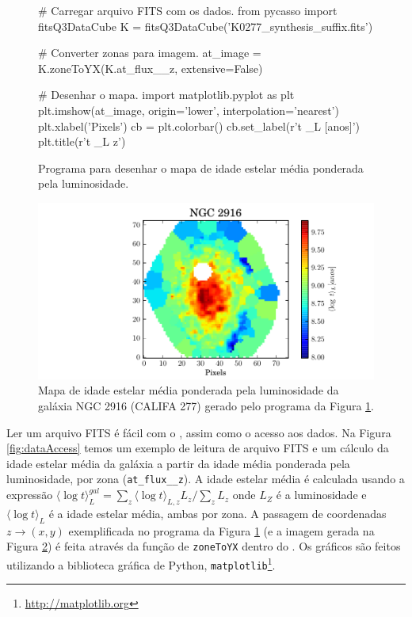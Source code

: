 \begin{figure}
	\begin{python}
# Carregar arquivo FITS com os dados.
from pycasso import fitsQ3DataCube
K = fitsQ3DataCube('K0277_synthesis_suffix.fits')

# Converter zonas para imagem.
at_image = K.zoneToYX(K.at_flux__z, extensive=False)

# Desenhar o mapa.
import matplotlib.pyplot as plt
plt.imshow(at_image, origin='lower', interpolation='nearest')
plt.xlabel('Pixels')
cb = plt.colorbar()
cb.set_label(r'\langle \log t \langle_L [anos]')
plt.title(r'\langle \log t \langle_{L z}')
	\end{python}
	\caption[Programa idade estelar média.]
	{Programa para desenhar o mapa de idade	estelar média ponderada pela luminosidade.}
	\label{fig:programaMapaIdade}
\end{figure}

\begin{figure}
	\includegraphics{figuras/at_flux_zone.pdf}
	\caption[Mapa da idade estelar média da galáxia NGC 2916 (CALIFA 277).] 
	{Mapa de idade estelar média ponderada pela luminosidade da galáxia NGC 2916 (CALIFA 277) gerado pelo programa da
	Figura \ref{fig:programaMapaIdade}.}
	\label{fig:mapaIdade}
\end{figure}

Ler um arquivo FITS é fácil com o \pycasso, assim como o acesso aos dados. Na Figura \ref{fig:dataAccess} temos um
exemplo de leitura de arquivo FITS e um cálculo da idade estelar média da galáxia a partir da idade média ponderada pela
luminosidade, por zona (\texttt{at\_flux\_\_z}). A idade estelar média é calculada usando a expressão $ \langle \log t
\rangle^{gal}_L = \sum_z \langle \log t \rangle_{L,z} L_z /\sum_z L_z$ onde $L_Z $ é a luminosidade e $ \langle \log t
\rangle_L $ é a idade estelar média, ambas por zona. A passagem de coordenadas $z \to (x, y)$ exemplificada no programa
da Figura \ref{fig:programaMapaIdade} (e a imagem gerada na Figura \ref{fig:mapaIdade}) é feita através da função de
\texttt{zoneToYX} dentro do \pycasso. Os gráficos são feitos utilizando a biblioteca gráfica de Python,
\texttt{matplotlib}\footnote{\url{http://matplotlib.org}}.

